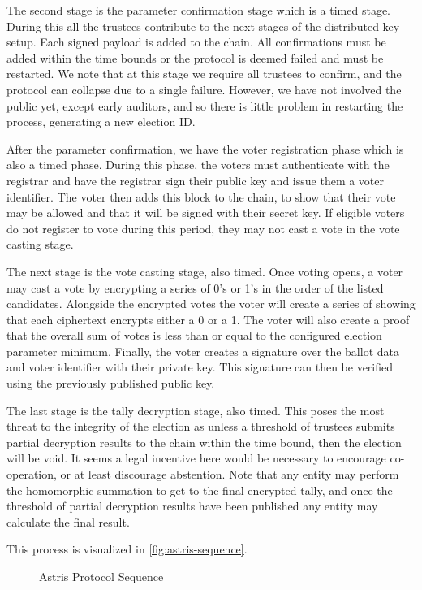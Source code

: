 The second stage is the parameter confirmation stage which is a timed stage. During this all the trustees contribute to the next stages of the distributed key setup. Each signed payload is added to the chain. All confirmations must be added within the time bounds or the protocol is deemed failed and must be restarted. We note that at this stage we require all trustees to confirm, and the protocol can collapse due to a single failure. However, we have not involved the public yet, except early auditors, and so there is little problem in restarting the process, generating a new election ID.

After the parameter confirmation, we have the voter registration phase which is also a timed phase. During this phase, the voters must authenticate with the registrar and have the registrar sign their public key and issue them a voter identifier. The voter then adds this block to the chain, to show that their vote may be allowed and that it will be signed with their secret key. If eligible voters do not register to vote during this period, they may not cast a vote in the vote casting stage.

The next stage is the vote casting stage, also timed. Once voting opens, a voter may cast a vote by encrypting a series of 0's or 1's in the order of the listed candidates. Alongside the encrypted votes the voter will create a series of  showing that each ciphertext encrypts either a 0 or a 1. The voter will also create a proof that the overall sum of votes is less than or equal to the configured election parameter minimum. Finally, the voter creates a signature over the ballot data and voter identifier with their private key. This signature can then be verified using the previously published public key.

The last stage is the tally decryption stage, also timed. This poses the most threat to the integrity of the election as unless a threshold of trustees submits partial decryption results to the chain within the time bound, then the election will be void. It seems a legal incentive here would be necessary to encourage co-operation, or at least discourage abstention. Note that any entity may perform the homomorphic summation to get to the final encrypted tally, and once the threshold of partial decryption results have been published any entity may calculate the final result.

This process is visualized in \autoref{fig:astris-sequence}.

\begin{figure}[H]
    \centering
    
    \caption{Astris Protocol Sequence}
    \label{fig:astris-sequence}
\end{figure}

